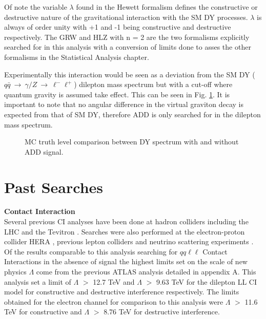         Of note the variable $\lambda$ found in the Hewett formalism defines the constructive or destructive nature of the gravitational interaction with the SM DY processes. $\lambda$ is always of order unity with +1 and -1 being constructive and destructive respectively.
        The GRW and HLZ with n = 2 are the two formalisms explicitly searched for in this analysis with a conversion of limits done to asses the other formalisms in the Statistical Analysis chapter.

        Experimentally this interaction would be seen as a deviation from the SM DY ($q\bar{q}~\rightarrow~\gamma/Z~\rightarrow~\ell^{-}\ell^{+}$) dilepton mass spectrum but with a cut-off where quantum gravity is assumed take effect. This can be seen in Fig. \ref{fig:theoryInvMassADD}. It is important to note that no angular difference in the virtual graviton decay is expected from that of SM DY, therefore ADD is only searched for in the dilepton mass spectrum.

        \begin{figure}[h]
            \begin{center}
            \end{center}
            \caption{MC truth level comparison between DY spectrum with and without ADD signal.}
            \label{fig:theoryInvMassADD}
        \end{figure}



\section{Past Searches}

    {\bf Contact Interaction}\\
        Several previous CI analyses have been done at hadron colliders including the LHC \cite{PhysRevD.87.015010,ATLAS:2012pu,PhysRevD.87.032001,PhysRevD.87.052017} and the Tevitron \cite{PhysRevLett.103.191803,PhysRevLett.96.211801,PhysRevLett.87.231803,PhysRevLett.82.4769,PhysRevLett.79.2198}. Searches were also performed at the electron-proton collider HERA \cite{Chekanov200423,Adloff200335}, previous lepton colliders \cite{Abdallah2009.60.1,Schael2007.49.411,Abdallah2006.45.589,Abbiendi2004.33.173,Acciarri200081} and neutrino scattering experiments \cite{}. Of the results comparable to this analysis searching for $qq\ell\ell$ Contact Interactions in the absence of signal the highest limits set on the scale of new physics $\Lambda$ come from the previous ATLAS analysis \cite{PhysRevD.87.015010} detailed in appendix A. This analysis set a limit of $\Lambda$ $>$ 12.7 TeV and $\Lambda$ $>$ 9.63 TeV for the dilepton LL CI model for constructive and destructive interference respectively. The limits obtained for the electron channel for comparison to this analysis were $\Lambda$ $>$ 11.6 TeV for constructive and $\Lambda$ $>$ 8.76 TeV for destructive interference. \\


